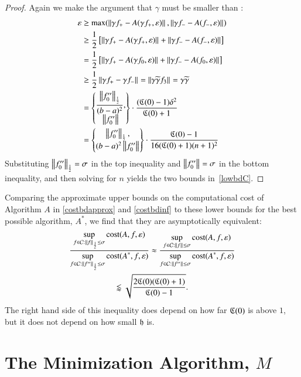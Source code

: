\documentclass[review]{elsarticle}
\newcommand{\abstol}{\varepsilon}
\theoremstyle{definition}
\newcommand{\tgamma}{\widetilde{\gamma}}
\begin{document}
\begin{proof}
Again we make the argument that $\gamma$ must be smaller than :
\begin{align*}
\abstol & \ge \max(\norm{\gamma f_+-A(\gamma f_+,\abstol)},\norm{\gamma f_--A(f_-, \abstol)}) \\
& \ge \frac{1}{2} \left[ \norm{\gamma f_+-A(\gamma f_+,\abstol)}+ \norm{\gamma f_--A(f_-, \abstol)} \right] \\
& = \frac{1}{2} \left[ \norm{\gamma f_+-A(\gamma f_0,\abstol)}+ \norm{\gamma f_--A(f_0, \abstol)} \right] \\
& \ge \frac{1}{2}  \norm{\gamma f_+ - \gamma f_-} =  \norm{\gamma \tgamma f_3} = \gamma \tgamma\\
& = \begin{Bmatrix} \displaystyle
\frac{\norm[\frac 12]{f_0''}}{(b-a)^2}, \\
\norm{f_0''}
\end{Bmatrix}  \cdot \frac{(\fC(0)-1)\delta^2}{\fC(0)+1} \\
& = \begin{Bmatrix} \displaystyle
\norm[\frac 12]{f_0''}, \\
(b-a)^2\norm{f_0''}
\end{Bmatrix}  \cdot \frac{\fC(0)-1}{16(\fC(0)+1)(n+1)^2}
\end{align*}
Substituting $\norm[\frac12]{f_0''} = \sigma$ in the top inequality and $\norm{f_0''} = \sigma$ in the bottom inequality, and then solving for $n$ yields the two bounds in~\eqref{lowbdC}.
\end{proof}

Comparing the approximate upper bounds on the computational cost of Algorithm $A$ in  \eqref{costbdapprox} and \eqref{costbdinf} to these lower bounds for the best possible algorithm, $A^*$, we find that they are asymptotically equivalent:
\begin{multline*}
\frac{\displaystyle \sup_{f \in \cc : \norm[\frac 12]{f} \le \sigma} \cost(A,f,\abstol)}{\displaystyle	\sup_{f \in \cc : \norm[\frac12]{f''} \le\sigma } \cost(A^*,f,\abstol) } \approx
\frac{\displaystyle \sup_{f \in \cc : \norm{f} \le \sigma} \cost(A,f,\abstol)}{\displaystyle	\sup_{f \in \cc : \norm{f''} \le\sigma } \cost(A^*,f,\abstol) } \\ \lessapprox \sqrt{\frac{2 \fC(0)(\fC(0)+1)}{\fC(0)-1}}.
\end{multline*}
The right hand side of this inequality does depend on how far $\fC(0)$ is above $1$, but it does not depend on how small $\fh$ is.

\section{The Minimization Algorithm, $M$} \label{sec:funmin}
\end{document}
